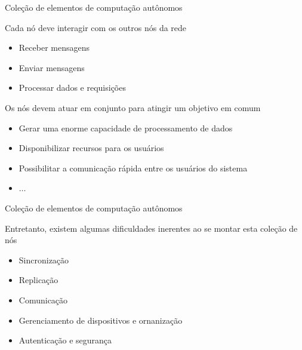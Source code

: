 \documentclass[compress]{beamer}
\begin{document}
\begin{frame}{Coleção de elementos de computação autônomos}

Cada nó deve interagir com os outros nós da rede
\begin{itemize}
    \item Receber mensagens
    \item Enviar mensagens
    \item Processar dados e requisições
\end{itemize}

\vspace{0.5cm}

Os nós devem atuar em conjunto para atingir um objetivo em comum
\begin{itemize}
    \item Gerar uma enorme capacidade de processamento de dados
    \item Disponibilizar recursos para os usuários
    \item Possibilitar a comunicação rápida entre os usuários do sistema
    \item $\ldots$
\end{itemize}
\end{frame}


\begin{frame}{Coleção de elementos de computação autônomos}

Entretanto, existem algumas dificuldades inerentes ao se montar esta coleção de nós

\vspace{0.5cm}
\begin{itemize}
    \item Sincronização
    \vspace{0.5cm}
    \item Replicação
    \vspace{0.5cm}
    \item Comunicação
    \vspace{0.5cm}
    \item Gerenciamento de dispositivos e ornanização
    \vspace{0.5cm}
    \item Autenticação e segurança
\end{itemize}

\end{frame}

\end{document}
